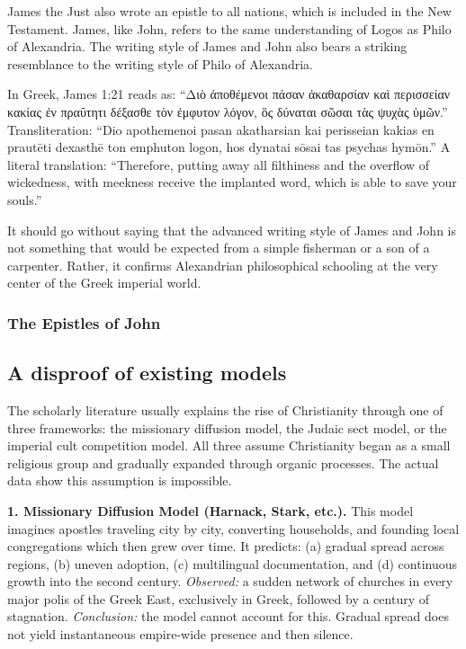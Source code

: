 James the Just also wrote an epistle to all nations, which is included in the New Testament.
James, like John, refers to the same understanding of Logos as Philo of Alexandria.
The writing style of James and John also bears a striking resemblance to the writing style of Philo of Alexandria.

In Greek, James 1:21 reads as:
``Διὸ ἀποθέμενοι πάσαν ἀκαθαρσίαν καὶ περισσείαν κακίας ἐν πραΰτητι δέξασθε τὸν ἐμφυτον λόγον, ὃς δύναται σῶσαι τὰς ψυχὰς ὑμῶν.''
Transliteration: ``Dio apothemenoi pasan akatharsian kai perisseian kakias en prautēti dexasthē ton emphuton logon, hos dynatai sōsai tas psychas hymōn.''
A literal translation: ``Therefore, putting away all filthiness and the overflow of wickedness, with meekness receive the implanted word, which is able to save your souls.''

It should go without saying that the advanced writing style of James and John is not something that would be expected from a simple fisherman or a son of a carpenter.
Rather, it confirms Alexandrian philosophical schooling at the very center of the Greek imperial world.

\subsubsection{The Epistles of John}\label{subsec:the-epistles-of-john}

\subsection{A disproof of existing models}\label{subsec:a-disproof-of-existing-models}

The scholarly literature usually explains the rise of Christianity through one of three frameworks: the missionary diffusion model, the Judaic sect model, or the imperial cult competition model.
All three assume Christianity began as a small religious group and gradually expanded through organic processes.
The actual data show this assumption is impossible.

\textbf{1. Missionary Diffusion Model (Harnack, Stark, etc.).}
This model imagines apostles traveling city by city, converting households, and founding local congregations which then grew over time.
It predicts: (a) gradual spread across regions, (b) uneven adoption, (c) multilingual documentation, and (d) continuous growth into the second century.
\emph{Observed:} a sudden network of churches in every major polis of the Greek East, exclusively in Greek, followed by a century of stagnation.
\emph{Conclusion:} the model cannot account for this. Gradual spread does not yield instantaneous empire-wide presence and then silence.

